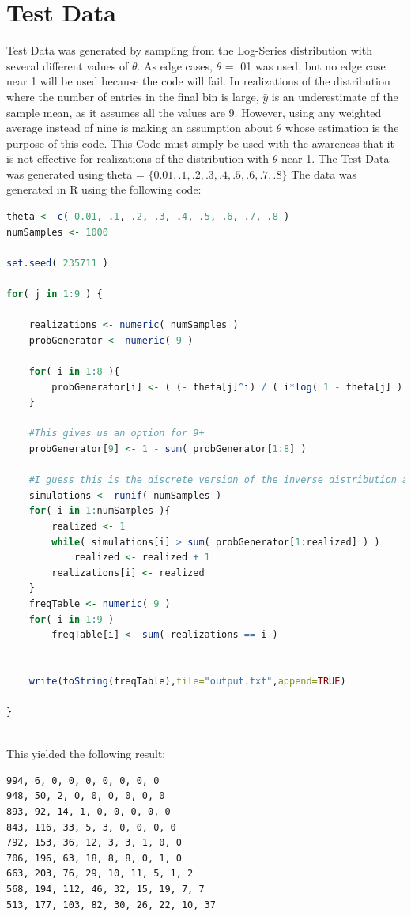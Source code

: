 \documentclass{paper}
\begin{document}
\section*{Test Data}
Test Data was generated by sampling from the Log-Series distribution with several different values of $\theta$. As edge cases, $\theta$ = .01 was used, but no edge case near 1 will be used because the code will fail. In realizations of the distribution where the number of entries in the final bin is large, $\bar{y}$ is an underestimate of the sample mean, as it assumes all the values are 9. However, using any weighted average instead of nine is making an assumption about $\theta$ whose estimation is the purpose of this code. This Code must simply be used with the awareness that it is not effective for realizations of the distribution with $\theta$ near 1. The Test Data was generated using theta = $\{ 0.01, .1, .2, .3, .4, .5, .6, .7, .8 \}$  The data was generated in R using the following code: 

\begin{lstlisting}[language=R]
theta <- c( 0.01, .1, .2, .3, .4, .5, .6, .7, .8 )
numSamples <- 1000

set.seed( 235711 )

for( j in 1:9 ) {

	realizations <- numeric( numSamples )
	probGenerator <- numeric( 9 )
	
	for( i in 1:8 ){
		probGenerator[i] <- ( (- theta[j]^i) / ( i*log( 1 - theta[j] ) ) )
	}
	
	#This gives us an option for 9+
	probGenerator[9] <- 1 - sum( probGenerator[1:8] )
	
	#I guess this is the discrete version of the inverse distribution applied to the Uniform
	simulations <- runif( numSamples )
	for( i in 1:numSamples ){
		realized <- 1
		while( simulations[i] > sum( probGenerator[1:realized] ) )
			realized <- realized + 1
		realizations[i] <- realized 
	}
	freqTable <- numeric( 9 )
	for( i in 1:9 )
		freqTable[i] <- sum( realizations == i )
		

	write(toString(freqTable),file="output.txt",append=TRUE)
	
}



\end{lstlisting}

This yielded the following result:
\begin{lstlisting}
994, 6, 0, 0, 0, 0, 0, 0, 0
948, 50, 2, 0, 0, 0, 0, 0, 0
893, 92, 14, 1, 0, 0, 0, 0, 0
843, 116, 33, 5, 3, 0, 0, 0, 0
792, 153, 36, 12, 3, 3, 1, 0, 0
706, 196, 63, 18, 8, 8, 0, 1, 0
663, 203, 76, 29, 10, 11, 5, 1, 2
568, 194, 112, 46, 32, 15, 19, 7, 7
513, 177, 103, 82, 30, 26, 22, 10, 37
\end{lstlisting}
\end{document}
